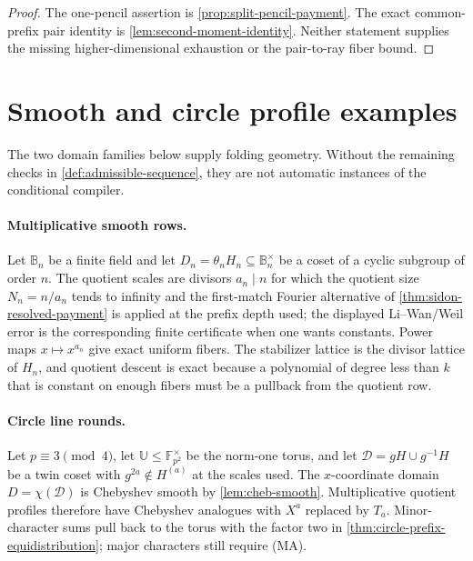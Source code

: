 \documentclass[12pt,a4paper]{amsart}
\numberwithin{equation}{section}
\theoremstyle{remark}
\newcommand{\F}{\mathbb F}
\newcommand{\B}{\mathbb B}
\newcommand{\Dcal}{\mathcal D}
\newcommand{\UU}{\mathbb U}
\begin{document}
\begin{proof}
The one-pencil assertion is \cref{prop:split-pencil-payment}.  The exact
common-prefix pair identity is \cref{lem:second-moment-identity}.  Neither
statement supplies the missing higher-dimensional exhaustion or the
pair-to-ray fiber bound.
\end{proof}

\section{Smooth and circle profile examples}\label{sec:examples}

The two domain families below supply folding geometry.  Without the
remaining checks in \cref{def:admissible-sequence}, they are not automatic
instances of the conditional compiler.

\paragraph{Multiplicative smooth rows.}
Let \(\B_n\) be a finite field and let \(D_n=\theta_nH_n\subseteq\B_n^\times\) be a coset of a cyclic subgroup of order \(n\).  The quotient scales are divisors \(a_n\mid n\) for which the quotient size \(N_n=n/a_n\) tends to infinity and the first-match Fourier alternative of \cref{thm:sidon-resolved-payment} is applied at the prefix depth used; the displayed Li--Wan/Weil error is the corresponding finite certificate when one wants constants.  Power maps \(x\mapsto x^{a_n}\) give exact uniform fibers.  The stabilizer lattice is the divisor lattice of \(H_n\), and quotient descent is exact because a polynomial of degree less than \(k\) that is constant on enough fibers must be a pullback from the quotient row.

\paragraph{Circle line rounds.}
Let \(p\equiv3\pmod4\), let \(\UU\le\F_{p^2}^\times\) be the norm-one
torus, and let \(\Dcal=gH\cup g^{-1}H\) be a twin coset with
\(g^{2a}\notin H^{(a)}\) at the scales used.  The \(x\)-coordinate domain
\(D=\chi(\Dcal)\) is Chebyshev smooth by \cref{lem:cheb-smooth}.
Multiplicative quotient profiles therefore have Chebyshev analogues with
\(X^a\) replaced by \(T_a\).  Minor-character sums pull back to the torus
with the factor two in \cref{thm:circle-prefix-equidistribution}; major
characters still require \textup{(MA)}.
\end{document}

